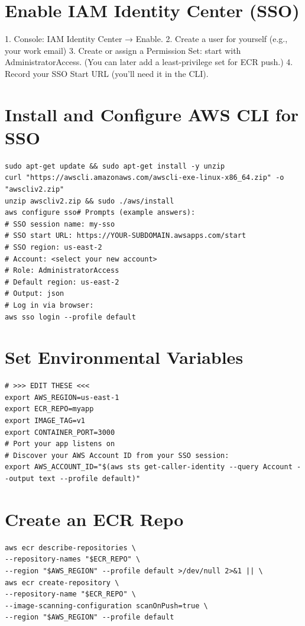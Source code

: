 \section{Enable IAM Identity Center (SSO)}
1. Console: IAM Identity Center → Enable.
2. Create a user for yourself (e.g., your work email)
3. Create or assign a Permission Set: start with AdministratorAccess. (You can later add a
least-privilege set for ECR push.)
4. Record your SSO Start URL (you’ll need it in the CLI).

\section{Install and Configure AWS CLI for SSO}

\begin{verbatim}
sudo apt-get update && sudo apt-get install -y unzip
curl "https://awscli.amazonaws.com/awscli-exe-linux-x86_64.zip" -o "awscliv2.zip"
unzip awscliv2.zip && sudo ./aws/install
aws configure sso# Prompts (example answers):
# SSO session name: my-sso
# SSO start URL: https://YOUR-SUBDOMAIN.awsapps.com/start
# SSO region: us-east-2
# Account: <select your new account>
# Role: AdministratorAccess
# Default region: us-east-2
# Output: json
# Log in via browser:
aws sso login --profile default
\end{verbatim}

\section{Set Environmental Variables}
\begin{verbatim}
# >>> EDIT THESE <<<
export AWS_REGION=us-east-1
export ECR_REPO=myapp
export IMAGE_TAG=v1
export CONTAINER_PORT=3000
# Port your app listens on
# Discover your AWS Account ID from your SSO session:
export AWS_ACCOUNT_ID="$(aws sts get-caller-identity --query Account --output text --profile default)"
\end{verbatim}

\section{Create an ECR Repo}
\begin{verbatim}
aws ecr describe-repositories \
--repository-names "$ECR_REPO" \
--region "$AWS_REGION" --profile default >/dev/null 2>&1 || \
aws ecr create-repository \
--repository-name "$ECR_REPO" \
--image-scanning-configuration scanOnPush=true \
--region "$AWS_REGION" --profile default
\end{verbatim}

